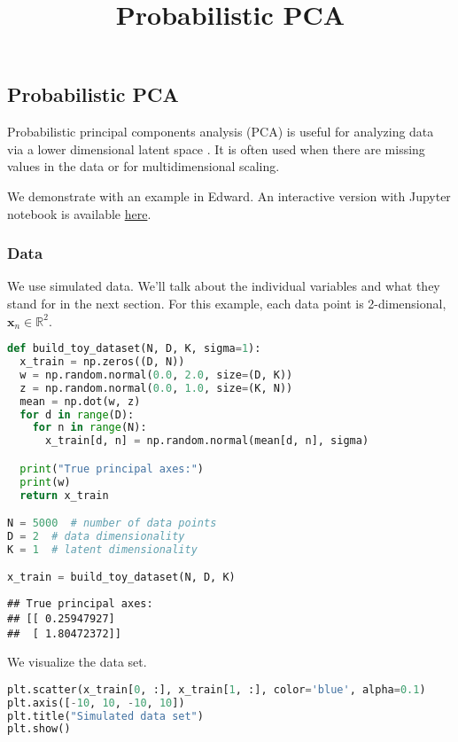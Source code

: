 \title{Probabilistic PCA}

\subsection{Probabilistic PCA}

Probabilistic principal components analysis (PCA) is
useful for analyzing data via a lower dimensional latent space
\citep{tipping1999probabilistic}. It is often
used when there are missing values in the data or for multidimensional
scaling.

We demonstrate with an example in Edward.
An interactive version with Jupyter notebook is available
\href{http://nbviewer.jupyter.org/github/blei-lab/edward/blob/master/notebooks/probabilistic_pca.ipynb}{here}.

\subsubsection{Data}

We use simulated data. We'll talk about the individual variables and
what they stand for in the next section. For this example, each data
point is 2-dimensional, $\mathbf{x}_n\in\mathbb{R}^2$.

\begin{lstlisting}[language=Python]
def build_toy_dataset(N, D, K, sigma=1):
  x_train = np.zeros((D, N))
  w = np.random.normal(0.0, 2.0, size=(D, K))
  z = np.random.normal(0.0, 1.0, size=(K, N))
  mean = np.dot(w, z)
  for d in range(D):
    for n in range(N):
      x_train[d, n] = np.random.normal(mean[d, n], sigma)

  print("True principal axes:")
  print(w)
  return x_train

N = 5000  # number of data points
D = 2  # data dimensionality
K = 1  # latent dimensionality

x_train = build_toy_dataset(N, D, K)
\end{lstlisting}

\begin{lstlisting}
## True principal axes:
## [[ 0.25947927]
##  [ 1.80472372]]
\end{lstlisting}

We visualize the data set.

\begin{lstlisting}[language=Python]
plt.scatter(x_train[0, :], x_train[1, :], color='blue', alpha=0.1)
plt.axis([-10, 10, -10, 10])
plt.title("Simulated data set")
plt.show()
\end{lstlisting}

